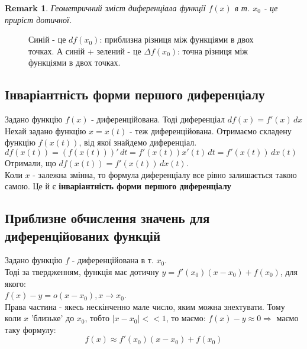 \documentclass[a4paper, 14pt]{article}
\theoremstyle{theoremdd}
\theoremstyle{theoremdd}
\theoremstyle{theoremdd}
\theoremstyle{theoremdd}
\theoremstyle{theoremdd}
\theoremstyle{theoremdd}
\newtheorem{remark}[theorem]{Remark}
\theoremstyle{theoremdd}
\theoremstyle{theoremdd}
\begin{document}
\begin{remark}
Геометричний зміст диференціала функції $f(x)$ в т. $x_0$ - це приріст дотичної.
\end{remark}
\begin{figure}[H]
\centering
{}
\caption*{Синій - це $df(x_0)$: приблизна різниця між функціями в двох точках. А синій + зелений - це $\Delta f(x_0)$: точна різниця між функціями в двох точках.}
\end{figure}

\subsection{Інваріантність форми першого диференціалу}
Задано функцію $f(x)$ - диференційована. Тоді диференціал $df(x) = f'(x)\,dx$\\
Нехай задано функцію $x = x(t)$ - теж диференційована. Отримаємо складену функцію $f(x(t))$, від якої знайдемо диференціал.\\
$df(x(t)) = (f(x(t)))'\,dt = f'(x(t))x'(t)\,dt = f'(x(t))\,dx(t)$\\
Отримали, що $df(x(t)) = f'(x(t))\,dx(t)$.\\
Коли $x$ - залежна змінна, то формула диференціалу все рівно залишається такою самою. Це й є \textbf{інваріантність форми першого диференціалу}

\subsection{Приблизне обчислення значень для диференційованих функцій}
Задано функцію $f$ - диференційована в т. $x_0$. \\ Тоді за твердженням, функція має дотичну $y = f'(x_0)(x-x_0)+f(x_0)$, для якого:\\
$f(x)-y = o(x-x_0), x \to x_0$.\\
Права частина - якесь нескінченно мале число, яким можна знехтувати.
Тому коли $x$ 'близьке' до $x_0$, тобто $|x-x_0| <<1$, то маємо: $f(x) -y \approx 0 \Rightarrow$ маємо таку формулу: 
$$f(x) \approx f'(x_0)(x-x_0)+f(x_0)$$
\end{document}
